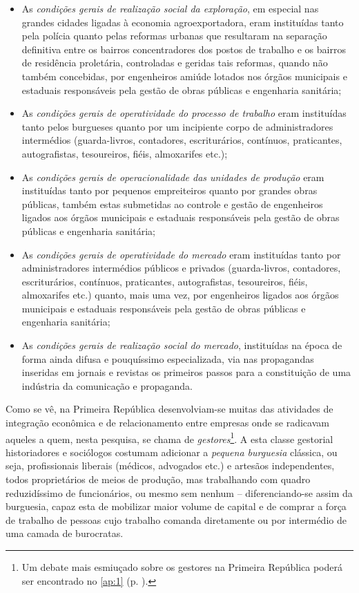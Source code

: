 \begin{itemize}
\item As \textit{condições gerais de realização social da exploração}, em especial nas grandes cidades ligadas à economia agroexportadora, eram instituídas tanto pela polícia quanto pelas reformas urbanas que resultaram na separação definitiva entre os bairros concentradores dos postos de trabalho e os bairros de residência proletária, controladas e geridas tais reformas, quando não também concebidas, por engenheiros amiúde lotados nos órgãos municipais e estaduais responsáveis pela gestão de obras públicas e engenharia sanitária; 
\item As \textit{condições gerais de operatividade do processo de trabalho} eram instituídas tanto pelos burgueses quanto por um incipiente corpo de administradores intermédios (guarda-livros, contadores, escriturários, contínuos, praticantes, autografistas, tesoureiros, fiéis, almoxarifes etc.);
\item As \textit{condições gerais de operacionalidade das unidades de produção} eram instituídas tanto por pequenos empreiteiros quanto por grandes obras públicas, também estas submetidas ao controle e gestão de engenheiros ligados aos órgãos municipais e estaduais responsáveis pela gestão de obras públicas e engenharia sanitária; 
\item As \textit{condições gerais de operatividade do mercado} eram instituídas tanto por administradores intermédios públicos e privados (guarda-livros, contadores, escriturários, contínuos, praticantes, autografistas, tesoureiros, fiéis, almoxarifes etc.) quanto, mais uma vez, por engenheiros ligados aos órgãos municipais e estaduais responsáveis pela gestão de obras públicas e engenharia sanitária; 
\item As \textit{condições gerais de realização social do mercado}, instituídas na época de forma ainda difusa e pouquíssimo especializada, via nas propagandas inseridas em jornais e revistas os primeiros passos para a constituição de uma indústria da comunicação e propaganda.
\end{itemize}

Como se vê, na Primeira República desenvolviam-se muitas das atividades de integração econômica e de relacionamento entre empresas onde se radicavam aqueles a quem, nesta pesquisa, se chama de \textit{gestores}\footnote{Um debate mais esmiuçado sobre os gestores na Primeira República poderá ser encontrado no \autoref{ap:1} (p. \pageref{ap:1}).}. A esta classe gestorial historiadores e sociólogos costumam adicionar a \textit{pequena burguesia} clássica, ou seja, profissionais liberais (médicos, advogados etc.) e artesãos independentes, todos proprietários de meios de produção, mas trabalhando com quadro reduzidíssimo de funcionários, ou mesmo sem nenhum -- diferenciando-se assim da burguesia, capaz esta de mobilizar maior volume de capital e de comprar a força de trabalho de pessoas cujo trabalho comanda diretamente ou por intermédio de uma camada de burocratas.


